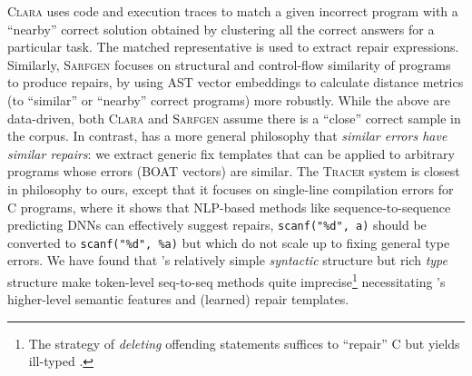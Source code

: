 %
\textsc{Clara} \citep{Gulwani_2018} uses code and execution traces to match a
given incorrect program with a ``nearby'' correct solution obtained by
clustering all the correct answers for a particular task. The matched
representative is used to extract repair expressions.
%
Similarly, \textsc{Sarfgen} \citep{Wang_2018} focuses on structural and
control-flow similarity of programs to produce repairs, by using AST vector
embeddings to calculate distance metrics (to ``similar'' or ``nearby'' correct
programs) more robustly.
%
While the above are data-driven, both \textsc{Clara} and \textsc{Sarfgen} assume
there is a ``close'' correct sample in the corpus.
%
In contrast, \toolname has a more general philosophy that \emph{similar errors
have similar repairs}: we extract generic fix templates that can be applied to
arbitrary programs whose errors (BOAT vectors) are similar.
%
The \textsc{Tracer} system \cite{TRACER2018} is closest in philosophy to ours,
except that it focuses on single-line compilation errors for C programs, where
it shows that NLP-based methods like sequence-to-sequence predicting DNNs can
effectively suggest repairs, \eg \verb+scanf("%d", a)+ should be converted to
\verb+scanf("%d", %a)+ but which do not scale up to fixing general type errors.
%
We have found that \ocaml's relatively simple
\emph{syntactic} structure but rich \emph{type}
structure make token-level seq-to-seq methods quite imprecise\footnote{The
strategy of \emph{deleting} offending statements suffices to ``repair'' C but
yields ill-typed \ocaml.} necessitating \toolname's higher-level semantic
features and (learned) repair templates.


%
%

